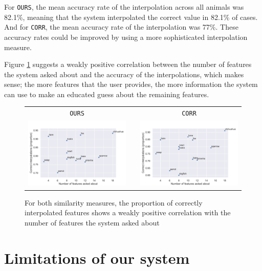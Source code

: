 \documentclass[11pt,a4paper]{article}
\begin{document}
For \texttt{OURS}, the mean accuracy rate of the interpolation across all animals was 82.1\%, meaning that the system interpolated the correct value in 82.1\% of cases.
And for \texttt{CORR}, the mean accuracy rate of the interpolation was 77\%.
These accuracy rates could be improved by using a more sophisticated interpolation measure.

Figure \ref{fig:interp-eval} suggests a weakly positive correlation between the number of features the system asked about and the accuracy of the interpolations, which makes sense; the more features that the user provides, the more information the system can use to make an educated guess about the remaining features.


\begin{figure}
\centering
\begin{tabular}{@{}ccc}
\texttt{OURS} && \texttt{CORR} \\
\includegraphics[trim=0 0 0 30,clip,width=.48\linewidth]{graphics/interpolation-eval-ours.pdf} && 
\includegraphics[trim=0 0 0 30,clip,width=.48\linewidth]{graphics/interpolation-eval-corr.pdf} \\
\end{tabular}
	\caption{For both similarity measures, the proportion of correctly interpolated features shows a weakly positive correlation with the number of features the system asked about}
	\label{fig:interp-eval}
\end{figure}

\section{Limitations of our system}
\label{sec:limit}
\end{document}
